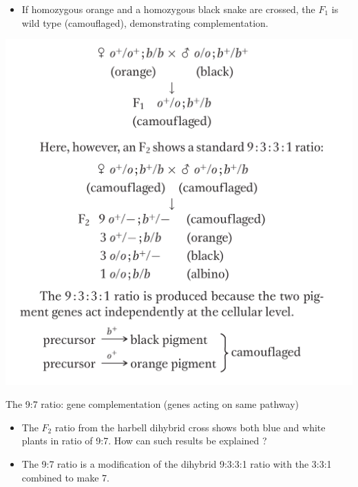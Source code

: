\documentclass[11pt,dvipsnames,ignorenonframetext,aspectratio=169]{beamer}
\providecommand{\tightlist}{%
  \setlength{\itemsep}{0pt}\setlength{\parskip}{0pt}}
\begin{document}
\begin{frame}{}
\protect\hypertarget{section-14}{}

\begin{itemize}
\tightlist
\item
  If homozygous orange and a homozygous black snake are crossed, the
  \(F_1\) is wild type (camouflaged), demonstrating complementation.
\end{itemize}

\begin{center}\includegraphics[width=0.34\linewidth]{./../images/gene_no_interaction2} \end{center}

\end{frame}

\begin{frame}{The 9:7 ratio: gene complementation (genes acting on same
pathway)}
\protect\hypertarget{the-97-ratio-gene-complementation-genes-acting-on-same-pathway}{}

\begin{itemize}
\tightlist
\item
  The \(F_2\) ratio from the harbell dihybrid cross shows both blue and
  white plants in ratio of 9:7. How can such results be explained ?
\item
  The 9:7 ratio is a modification of the dihybrid 9:3:3:1 ratio with the
  3:3:1 combined to make 7.
\end{itemize}

\end{frame}
\end{document}
